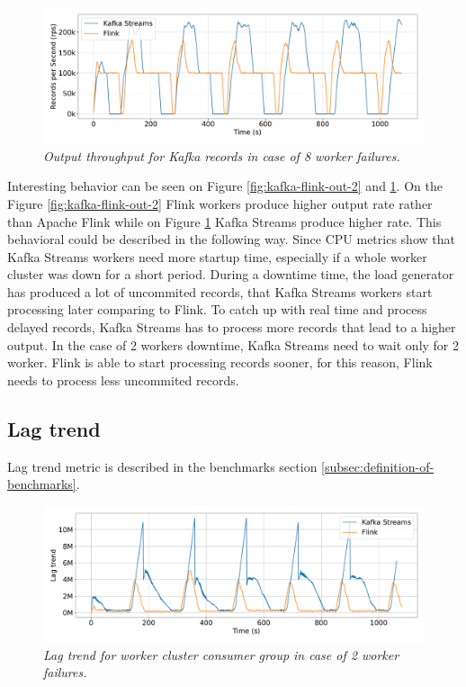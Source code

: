 \begin{figure}[H]
    \centering
    \includegraphics[width=1\textwidth]{figures/kafka-flink/output-throught-8pods-kafka-flink}
    \caption{\textit{Output throughput for Kafka records in case of 8 worker failures.}}
    \label{fig:kafka-flink-out-8}
\end{figure}

Interesting behavior can be seen on Figure \ref{fig:kafka-flink-out-2} and \ref{fig:kafka-flink-out-8}.
On the Figure \ref{fig:kafka-flink-out-2} Flink workers produce higher output rate
rather than Apache Flink while on Figure \ref{fig:kafka-flink-out-8} Kafka Streams produce
higher rate.
This behavioral could be described in the following way.
Since CPU metrics show that Kafka Streams workers need more startup time, especially
if a whole worker cluster was down for a short period.
During a downtime time, the load generator has produced a lot of uncommited records,
that Kafka Streams workers start processing later comparing to Flink.
To catch up with real time and process delayed records, Kafka Streams has to process
more records that lead to a higher output.
In the case of 2 workers downtime, Kafka Streams need to wait only for 2 worker.
Flink is able to start processing records sooner, for this reason, Flink needs to
process less uncommited records.

\newpage
\subsection{Lag trend}\label{subsec:lag-trend}
Lag trend metric is described in the benchmarks section \ref{subsec:definition-of-benchmarks}.

\begin{figure}[H]
    \centering
    \includegraphics[width=1\textwidth]{figures/kafka-flink/lag-trend-2pod-kafka-flink}
    \caption{\textit{Lag trend for worker cluster consumer group in case of 2 worker failures.}}
    \label{fig:kafka-flink-lag-2}
\end{figure}


